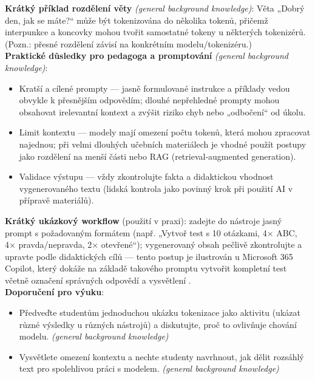 \documentclass{report}%
\begin{document}
\noindent\textbf{Krátký příklad rozdělení věty} \emph{(general background knowledge)}: Věta „Dobrý den, jak se máte?“ může být tokenizována do několika tokenů, přičemž interpunkce a koncovky mohou tvořit samostatné tokeny u některých tokenizérů. (Pozn.: přesné rozdělení závisí na konkrétním modelu/tokenizéru.)\\

\noindent\textbf{Praktické důsledky pro pedagoga a promptování} \emph{(general background knowledge)}:
\begin{itemize}
  \item Kratší a cílené prompty — jasně formulované instrukce a příklady vedou obvykle k přesnějším odpovědím; dlouhé nepřehledné prompty mohou obsahovat irelevantní kontext a zvýšit riziko chyb nebo „odbočení“ od úkolu.
  \item Limit kontextu — modely mají omezení počtu tokenů, která mohou zpracovat najednou; při velmi dlouhých učebních materiálech je vhodné použít postupy jako rozdělení na menší části nebo RAG (retrieval‑augmented generation). 
  \item Validace výstupu — vždy zkontrolujte fakta a didaktickou vhodnost vygenerovaného textu (lidská kontrola jako povinný krok při použití AI v přípravě materiálů).
\end{itemize}

\noindent\textbf{Krátký ukázkový workflow} (použití v praxi): zadejte do nástroje jasný prompt s požadovaným formátem (např. „Vytvoř test s 10 otázkami, 4× ABC, 4× pravda/nepravda, 2× otevřené“); vygenerovaný obsah pečlivě zkontrolujte a upravte podle didaktických cílů — tento postup je ilustrován u Microsoft 365 Copilot, který dokáže na základě takového promptu vytvořit kompletní test včetně označení správných odpovědí a vysvětlení \cite{kb_ai_101_tipu_pdf_04e4a115_page_36_1}.\\

\noindent\textbf{Doporučení pro výuku}:
\begin{itemize}
  \item Předveďte studentům jednoduchou ukázku tokenizace jako aktivitu (ukázat různé výsledky u různých nástrojů) a diskutujte, proč to ovlivňuje chování modelu. \emph{(general background knowledge)}
  \item Vysvětlete omezení kontextu a nechte studenty navrhnout, jak dělit rozsáhlý text pro spolehlivou práci s modelem. \emph{(general background knowledge)}
\end{itemize}%
\end{document}
